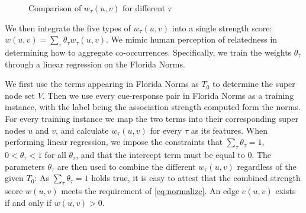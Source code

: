 \begin{figure}[htb]
\centering
{}
\caption{Comparison of $w_\tau(u, v)$ for different $\tau$}
\label{fig:distribution}
\end{figure}

We then integrate the five types of $w_\tau(u, v)$ into a single
strength score: $w(u, v) = \sum_{\tau}\theta_\tau w_\tau(u, v)$. 
We mimic human perception of relatedness in
determining how to aggregate co-occurrences. Specifically, we train
the weights $\theta_\tau$ through a linear regression on
the Florida Norms.

We first use the terms appearing in Florida Norms as $T_0$ to 
determine the super node set $V$. 
Then we use every cue-response pair in Florida Norms as a training
instance, with the label being the association strength computed 
form the norms.  For every training instance we
map the two terms into their corresponding super nodes $u$ and $v$, and
calculate $w_\tau(u, v)$ for every $\tau$ as its features. When
performing linear regression, we impose the constraints that
$\sum_{\tau}\theta_\tau = 1$, $0< \theta_\tau < 1$ for all $\theta_\tau$, and
that the intercept term must be equal to 0. The
parameters $\theta_\tau$ are then used to combine the different $w_\tau(u, v)$
regardless of the given $T_0$: As $\sum_{\tau}\theta_\tau = 1$ holds true, it is
easy to attest that the combined strength score $w(u, v)$ meets
the requirement of \eqref{eq:normalize}. An edge $e(u, v)$ exists
if and only if $w(u, v)>0$.

